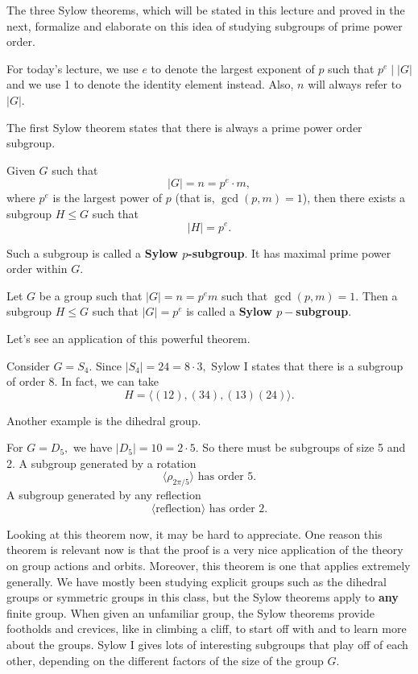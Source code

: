 The three Sylow theorems, which will be stated in this lecture and proved in the next, formalize and elaborate on this idea of studying subgroups of prime power order. 

\begin{note}
For today's lecture, we use $e$ to denote the largest exponent of $p$ such that $p^e \mid |G|$ and we use 1 to denote the identity element instead. Also, $n$ will always refer to $|G|.$
\end{note}

The first Sylow theorem states that there is always a prime power order subgroup. 
\begin{theorem}[Sylow I]

Given $G$ such that \[|G| = n = p^e \cdot m,\] where $p^e$ is the largest power of $p$ (that is, $\gcd(p, m) = 1$), then there exists a subgroup $H \leq G$ such that \[|H| = p^e.\]
\end{theorem} 

Such a subgroup is called a \textbf{Sylow $p$-subgroup}. It has maximal prime power order within $G.$

\begin{definition}
Let $G$ be a group such that $|G| = n = p^e m$ such that $\gcd(p, m) = 1.$ Then a subgroup $H \leq G$ such that $|G| = p^e$ is called a \textbf{Sylow $p-$subgroup}.
\end{definition}

Let's see an application of this powerful theorem. 

\begin{example}
Consider $G = S_4.$ Since $|S_4| = 24 = 8 \cdot 3,$ Sylow I states that there is a subgroup of order 8. In fact, we can take \[H = \langle (12), (34), (13)(24) \rangle.\] 
\end{example}

Another example is the dihedral group. 

\begin{example}
For $G = D_5,$ we have $|D_5| = 10 = 2 \cdot 5.$ So there must be subgroups of size 5 and 2. A subgroup generated by a rotation
\[\langle \rho_{2\pi / 5} \rangle \text{ has order 5.}\] A subgroup generated by any reflection \[ \langle \text{reflection} \rangle \text{ has order 2.}\]
\end{example}

Looking at this theorem now, it may be hard to appreciate. One reason this theorem is relevant now is that the proof is a very nice application of the theory on group actions and orbits. Moreover, this theorem is one that applies extremely generally. We have mostly been studying explicit groups such as the dihedral groups or symmetric groups in this class, but the Sylow theorems apply to \textbf{any} finite group. When given an unfamiliar group, the Sylow theorems provide footholds and crevices, like in climbing a cliff, to start off with and to learn more about the groups. Sylow I gives lots of interesting subgroups that play off of each other, depending on the different factors of the size of the group $G.$ 

